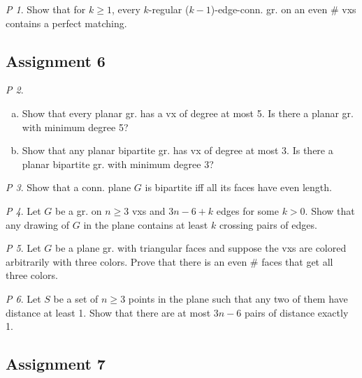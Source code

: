 \documentclass[11pt, fleqn, a4paper, landscape]{article}
\theoremstyle{plain} %
\theoremstyle{remark} %
\newtheorem{problem}{P}
\theoremstyle{definition} %
\begin{document}
\begin{multicols}{5}
\begin{problem}
Show that for $k\ge 1$, every $k$-regular ($k- 1$)-edge-conn. gr. on an even \# vxs contains a perfect matching.
\end{problem}

\subsection{Assignment 6}

\addtocounter{problem}{1}

\begin{problem}
\begin{enumerate}[(a)]
\item Show that every planar gr. has a vx of degree at most 5. Is there a planar gr. with minimum degree 5?
\item Show that any planar bipartite gr. has vx of degree at most 3. Is there a planar bipartite gr. with minimum degree 3?
\end{enumerate}
\end{problem}

\begin{problem}
Show that a conn. plane $G$ is bipartite iff all its faces have even length.
\end{problem}

\begin{problem}
Let $G$ be a gr. on $n\ge 3$ vxs and $3n- 6 + k$ edges for some $k > 0$. Show that any drawing of $G$ in the plane contains at least $k$ crossing pairs of edges.
\end{problem}

\begin{problem}
Let $G$ be a plane gr. with triangular faces and suppose the vxs are colored arbitrarily with three colors. Prove that there is an even \# faces that get all three colors.
\end{problem}

\begin{problem}
Let $S$ be a set of $n\ge 3$ points in the plane such that any two of them have distance at least 1. Show that there are at most $3n - 6$ pairs of distance exactly 1.
\end{problem}

\subsection{Assignment 7}


\end{multicols}
\end{document}
